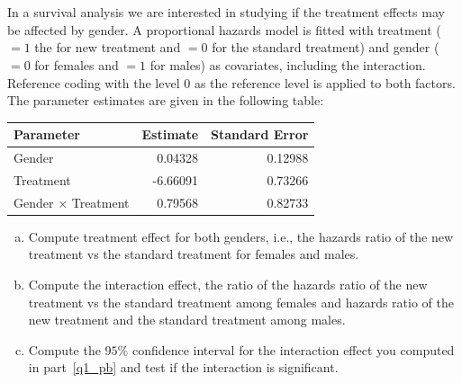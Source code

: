 \documentclass[12pt]{elegantbook}
\begin{document}
 

\setcounter{chapter}{3}
\chapter{}

    
    \begin{exercise*}[1]
        In a survival analysis we are interested in studying if the treatment effects may be affected by gender. A proportional hazards model is fitted with treatment ($=1$ the for new treatment and $=0$ for the standard treatment) and gender ($=0$ for females and $=1$ for males) as covariates, including the interaction. Reference coding with the level $0$ as the reference level is applied to both factors. The parameter estimates are given in the following table: 
        \begin{table}[H]
            \centering
            \begin{tabular}{lrr}
            \hline
            Parameter                 & Estimate & Standard Error \\ \hline
            Gender                    & 0.04328  & 0.12988        \\
            Treatment                 & -6.66091 & 0.73266        \\
            Gender $\times$ Treatment & 0.79568  & 0.82733        \\ \hline
            \end{tabular}
        \end{table}
        \begin{enumerate}[(a)]
            \item Compute treatment effect for both genders, i.e., the hazards ratio of the new treatment vs the standard treatment for females and males. 
            \item Compute the interaction effect, the ratio of the hazards ratio of the new treatment vs the standard treatment among females and hazards ratio of the new treatment and the standard treatment among males.\label{q1_pb}
            \item Compute the $95\%$ confidence interval for the interaction effect you computed in part~\ref{q1_pb} and test if the interaction is significant. 
        \end{enumerate}
    \end{exercise*}
\end{document}
